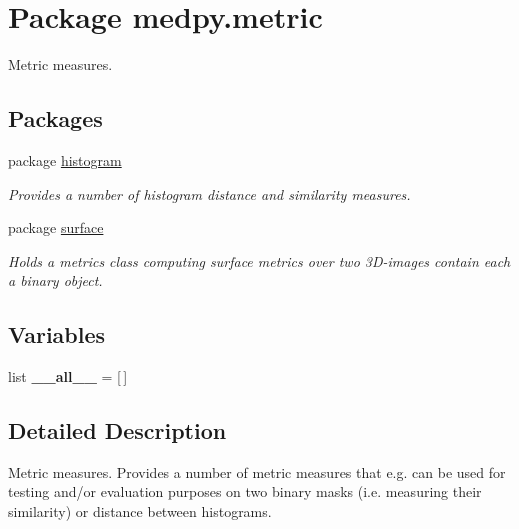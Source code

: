 \hypertarget{namespacemedpy_1_1metric}{
\section{Package medpy.metric}
\label{namespacemedpy_1_1metric}
}


Metric measures.  


\subsection*{Packages}
\begin{DoxyCompactItemize}
\item 
package \hyperlink{namespacemedpy_1_1metric_1_1histogram}{histogram}


\begin{DoxyCompactList}\small\item\em Provides a number of histogram distance and similarity measures. \end{DoxyCompactList}

\item 
package \hyperlink{namespacemedpy_1_1metric_1_1surface}{surface}


\begin{DoxyCompactList}\small\item\em Holds a metrics class computing surface metrics over two 3D-\/images contain each a binary object. \end{DoxyCompactList}

\end{DoxyCompactItemize}
\subsection*{Variables}
\begin{DoxyCompactItemize}
\item 
\hypertarget{namespacemedpy_1_1metric_a16520369b1c777530ed29bb33fe08cd4}{
list {\bfseries \_\-\_\-all\_\-\_\-} = \mbox{[}$\,$\mbox{]}}
\label{namespacemedpy_1_1metric_a16520369b1c777530ed29bb33fe08cd4}

\end{DoxyCompactItemize}


\subsection{Detailed Description}
Metric measures. Provides a number of metric measures that e.g. can be used for testing and/or evaluation purposes on two binary masks (i.e. measuring their similarity) or distance between histograms.

